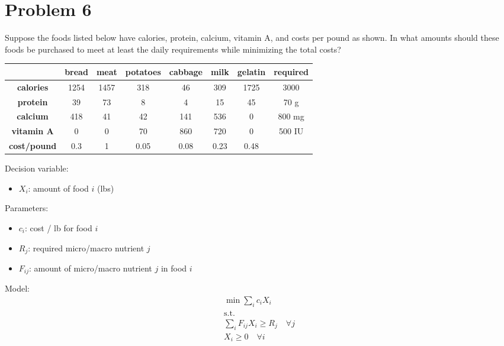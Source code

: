 \documentclass[10pt]{article}
\begin{document}
\section{Problem 6}
Suppose the foods listed below have calories, protein, calcium, vitamin A, and costs per pound as shown. In what amounts should these foods be purchased to meet at least the daily requirements while minimizing the total costs? 
\begin{center}
    \begin{tabular}{|c|c|c|c|c|c|c|c|}
        \hline 
        & \textbf{bread} & \textbf{meat} & \textbf{potatoes} & \textbf{cabbage} & \textbf{milk} & \textbf{gelatin} & \textbf{required}\\\hline 
        \textbf{calories} & 1254 & 1457 & 318 & 46 & 309 & 1725 & 3000\\\hline 
        \textbf{protein} & 39 & 73 & 8 & 4 & 15 & 45 & 70 g\\\hline 
        \textbf{calcium} & 418 & 41 & 42 & 141 & 536 & 0 & 800 mg\\\hline 
        \textbf{vitamin A} & 0 & 0 & 70 & 860 & 720 & 0 & 500 IU\\\hline 
        \textbf{cost/pound} & 0.3 & 1 & 0.05 & 0.08 & 0.23 & 0.48 & \\\hline 
    \end{tabular}
\end{center}

Decision variable: 
\begin{itemize}
    \item $X_i $: amount of food $i $ (lbs)
\end{itemize}
Parameters: 
\begin{itemize}
    \item $c_i $: cost / lb for food $i $
    \item $R_{j} $: required micro/macro nutrient $j $
    \item $F_{ij}$: amount of micro/macro nutrient $j $ in food $i $
\end{itemize}

Model: 
\begin{gather*}
    \min\sum_i c_iX_i\\
    \text{s.t.}\\
    \sum_iF_{ij}X_i \ge R_{j}\quad\forall j\\
    X_i \ge 0\quad\forall i
\end{gather*}

\newpage
\end{document}

